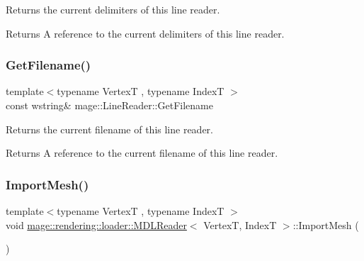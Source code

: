 Returns the current delimiters of this line reader.

\begin{DoxyReturn}{Returns}
A reference to the current delimiters of this line reader. 
\end{DoxyReturn}
\mbox{\label{classmage_1_1rendering_1_1loader_1_1_m_d_l_reader_a682ed8030c99a62d4409a01f9efa6d6b}} 
\subsubsection{\texorpdfstring{Get\+Filename()}{GetFilename()}}
{\footnotesize\ttfamily template$<$typename VertexT , typename IndexT $>$ \\
const wstring\& mage\+::\+Line\+Reader\+::\+Get\+Filename\hspace{0.3cm}{\ttfamily [noexcept]}}

Returns the current filename of this line reader.

\begin{DoxyReturn}{Returns}
A reference to the current filename of this line reader. 
\end{DoxyReturn}
\mbox{\label{classmage_1_1rendering_1_1loader_1_1_m_d_l_reader_a512618ed9e79671dbcb468d155272b7e}} 
\subsubsection{\texorpdfstring{Import\+Mesh()}{ImportMesh()}}
{\footnotesize\ttfamily template$<$typename VertexT , typename IndexT $>$ \\
void \mbox{\hyperlink{classmage_1_1rendering_1_1loader_1_1_m_d_l_reader}{mage\+::rendering\+::loader\+::\+M\+D\+L\+Reader}}$<$ VertexT, IndexT $>$\+::Import\+Mesh (\begin{DoxyParamCaption}{ }\end{DoxyParamCaption})\hspace{0.3cm}{\ttfamily [private]}}

